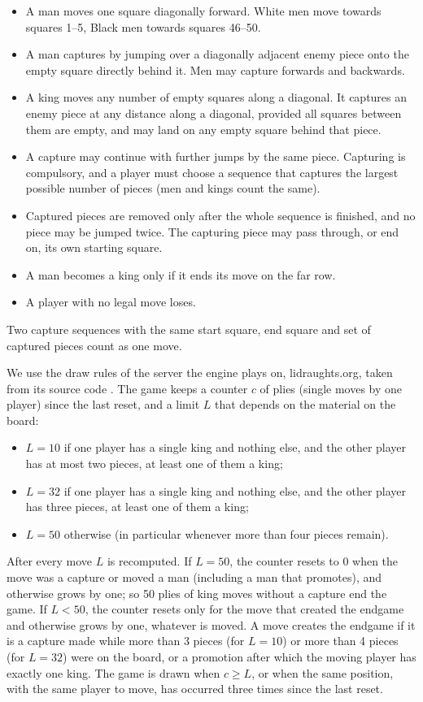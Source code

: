 \begin{itemize}[nosep]
  \item A man moves one square diagonally forward. White men move towards
        squares 1--5, Black men towards squares 46--50.
  \item A man captures by jumping over a diagonally adjacent enemy piece onto the
        empty square directly behind it. Men may capture forwards and backwards.
  \item A king moves any number of empty squares along a diagonal. It captures
        an enemy piece at any distance along a diagonal, provided all squares
        between them are empty, and may land on any empty square behind that
        piece.
  \item A capture may continue with further jumps by the same piece. Capturing
        is compulsory, and a player must choose a sequence that captures the
        largest possible number of pieces (men and kings count the same).
  \item Captured pieces are removed only after the whole sequence is finished,
        and no piece may be jumped twice. The capturing piece may pass through,
        or end on, its own starting square.
  \item A man becomes a king only if it ends its move on the far row.
  \item A player with no legal move loses.
\end{itemize}

Two capture sequences with the same start square, end square and set of captured
pieces count as one move.

We use the draw rules of the server the engine plays on, lidraughts.org, taken
from its source code \parencite{lidraughts}. The game keeps a counter $c$ of plies
(single moves by one player) since the last reset, and a limit $L$ that depends
on the material on the board:
\begin{itemize}[nosep]
  \item $L=10$ if one player has a single king and nothing else, and the other
        player has at most two pieces, at least one of them a king;
  \item $L=32$ if one player has a single king and nothing else, and the other
        player has three pieces, at least one of them a king;
  \item $L=50$ otherwise (in particular whenever more than four pieces remain).
\end{itemize}
After every move $L$ is recomputed. If $L=50$, the counter resets to 0 when the
move was a capture or moved a man (including a man that promotes), and otherwise
grows by one; so 50 plies of king moves without a capture end the game. If
$L<50$, the counter resets only for the move that created the endgame and
otherwise grows by one, whatever is moved. A move creates the endgame if it is a
capture made while more than 3 pieces (for $L=10$) or more than 4 pieces (for
$L=32$) were on the board, or a promotion after which the moving player has
exactly one king. The game is drawn when $c \ge L$, or when the same position,
with the same player to move, has occurred three times since the last reset.

